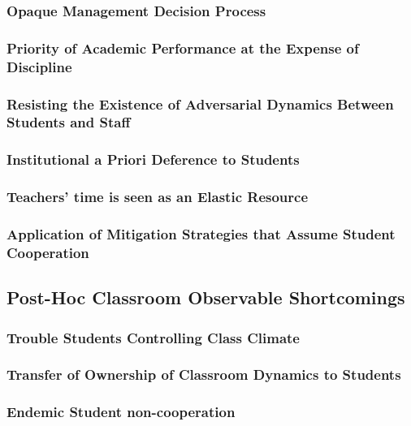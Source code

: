 \documentclass[12pt]{article}
\begin{document}
	\subsubsection{Opaque Management Decision Process}
	\subsubsection{Priority of Academic Performance at the Expense of Discipline}
	\subsubsection{Resisting the Existence of Adversarial Dynamics Between Students and Staff}
	\subsubsection{Institutional a Priori Deference to Students}
	\subsubsection{Teachers' time is seen as an Elastic Resource}
	\subsubsection{Application of Mitigation Strategies that Assume Student Cooperation}

	\subsection{Post-Hoc Classroom Observable Shortcomings}
	\subsubsection{Trouble Students Controlling Class Climate}
	\subsubsection{Transfer of Ownership of Classroom Dynamics to Students}
	\subsubsection{Endemic Student non-cooperation}
\end{document}
